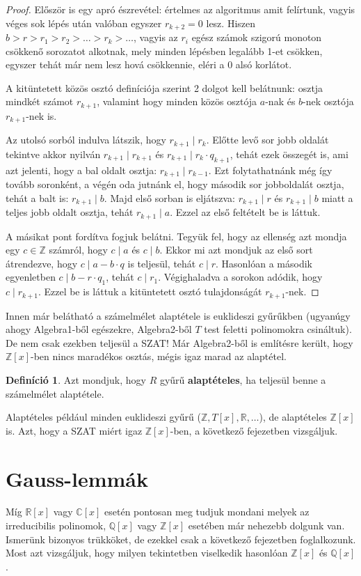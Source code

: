\documentclass[12pt]{book}
\theoremstyle{plain} %
\theoremstyle{definition} %
\newtheorem{defi/}{Definíció}[section]
\newenvironment{defi}
  {\renewcommand{\qedsymbol}{$\clubsuit$}%
   \pushQED{\qed}\begin{defi/}}
  {\popQED\end{defi/}}
\theoremstyle{remark}
\renewcommand\qedsymbol{$\blacksquare$}
\numberwithin{equation}{section}  %
\begin{document}
	\begin{proof}
		Először is egy apró észrevétel: értelmes az algoritmus amit felírtunk, vagyis véges sok lépés után valóban egyszer $r_{k+2}=0$ lesz. Hiszen $b>r>r_1>r_2>\ldots > r_{k}> \ldots$, vagyis az $r_i$ egész számok szigorú monoton csökkenő sorozatot alkotnak, mely minden lépésben legalább 1-et csökken, egyszer tehát már nem lesz hová csökkennie, eléri a 0 alsó korlátot.
		
		A kitüntetett közös osztó definíciója szerint 2 dolgot kell belátnunk: osztja mindkét számot $r_{k+1}$, valamint hogy minden közös osztója $a$-nak és $b$-nek osztója $r_{k+1}$-nek is.
		
		Az utolsó sorból indulva látszik, hogy $r_{k+1}\mid r_k$. Előtte levő sor jobb oldalát tekintve akkor nyilván $r_{k+1}\mid r_{k+1}$ és $r_{k+1}\mid r_k\cdot q_{k+1}$, tehát ezek összegét is, ami azt jelenti, hogy a bal oldalt osztja: $r_{k+1}\mid r_{k-1}$. Ezt folytathatnánk még így tovább soronként, a végén oda jutnánk el, hogy második sor jobboldalát osztja, tehát a balt is: $r_{k+1}\mid b$. Majd első sorban is eljátszva: $r_{k+1}\mid r$ és $r_{k+1}\mid b$ miatt a teljes jobb oldalt osztja, tehát $r_{k+1} \mid a$. Ezzel az első feltételt be is láttuk.
		
		A másikat pont fordítva fogjuk belátni. Tegyük fel, hogy az ellenség azt mondja egy $c\in \mathbb{Z}$ számról, hogy $c\mid a$ és $c\mid b$. Ekkor mi azt mondjuk az első sort átrendezve, hogy $c\mid a-b\cdot q$ is teljesül, tehát $c\mid r$. Hasonlóan a második egyenletben $c\mid b-r\cdot q_1$, tehát $c\mid r_1$. Végighaladva a sorokon adódik, hogy $c\mid r_{k+1}$. Ezzel be is láttuk a kitüntetett osztó tulajdonságát $r_{k+1}$-nek.
	\end{proof}
	Innen már belátható a számelmélet alaptétele is euklideszi gyűrűkben (ugyanúgy ahogy Algebra1-ből egészekre, Algebra2-ből $T$ test feletti polinomokra csináltuk). De nem csak ezekben teljesül a SZAT! Már Algebra2-ből is említésre került, hogy $\mathbb{Z}[x]$-ben nincs maradékos osztás, mégis igaz marad az alaptétel.
	\begin{defi}
		Azt mondjuk, hogy $R$ gyűrű \textbf{alaptételes}, ha teljesül benne a számelmélet alaptétele.
	\end{defi}
	Alaptételes például minden euklideszi gyűrű ($\mathbb{Z}, T[x], \mathbb{R}, \ldots$), de alaptételes $\mathbb{Z}[x]$ is. Azt, hogy a SZAT miért igaz $\mathbb{Z}[x]$-ben, a következő fejezetben vizsgáljuk.
	
	
	\section{Gauss-lemmák}
	Míg $\mathbb{R}[x]$ vagy $\mathbb{C}[x]$ esetén pontosan meg tudjuk mondani melyek az irreducibilis polinomok, $\mathbb{Q}[x]$ vagy $\mathbb{Z}[x]$ esetében már nehezebb dolgunk van. Ismerünk bizonyos trükköket, de ezekkel csak a következő fejezetben foglalkozunk. Most azt vizsgáljuk, hogy milyen tekintetben viselkedik hasonlóan $\mathbb{Z}[x]$ és $\mathbb{Q}[x]$.
	
\end{document}
